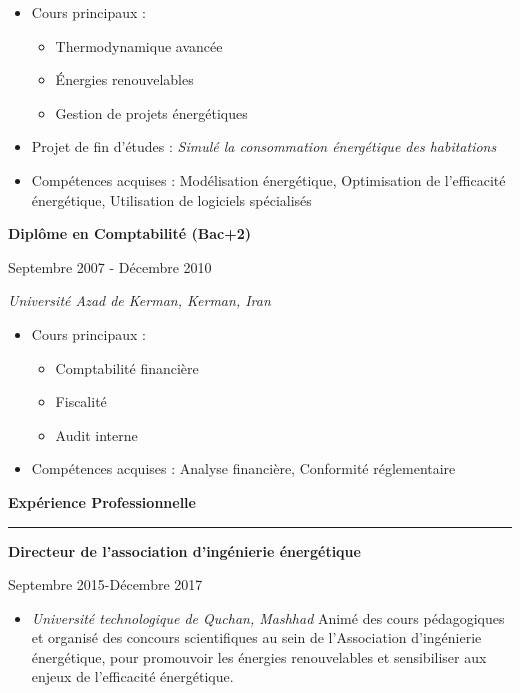 \documentclass[a4paper]{letter}
\newcommand{\divider}{\rule{\linewidth}{0.9pt}}
\begin{document}
\begin{minipage}[t]{0.60\textwidth}
\begin{itemize}
    \footnotesize
    \item Cours principaux :
        \begin{itemize}
            \item Thermodynamique avancée
            \item Énergies renouvelables
            \item Gestion de projets énergétiques
        \end{itemize}
    \item Projet de fin d'études : \textit{Simulé la consommation énergétique des habitations}
    \item Compétences acquises : Modélisation énergétique, Optimisation de l'efficacité énergétique, Utilisation de logiciels spécialisés
\end{itemize}

\vspace{3mm}

{\textbf{Diplôme en Comptabilité (Bac+2)}}

{\footnotesize Septembre 2007 - Décembre 2010}

{\textit{Université Azad de Kerman, Kerman, Iran}}

\vspace{1mm}
\begin{itemize}


    \footnotesize
    
    \item Cours principaux :
        \begin{itemize}
            \item Comptabilité financière
            \item Fiscalité
            \item Audit interne
        \end{itemize}
    \item Compétences acquises : Analyse financière, Conformité réglementaire
\end{itemize}




\vspace{3mm}


{\large \textbf{Expérience Professionnelle}}
\divider

{\textbf{Directeur de l'association d'ingénierie énergétique}}

{\footnotesize Septembre 2015-Décembre 2017}
\begin{itemize}
   \footnotesize \item \textit{Université technologique de Quchan, Mashhad}
   \newline
   Animé des cours pédagogiques et organisé des concours scientifiques au sein de l'Association d'ingénierie énergétique, pour promouvoir les énergies renouvelables et sensibiliser aux enjeux de l'efficacité énergétique.
\end{itemize}


\end{minipage}
\end{document}
